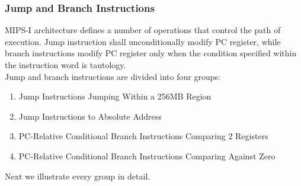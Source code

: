 \documentclass[]{scrartcl}
\begin{document}
\subsubsection{Jump and Branch Instructions}

MIPS-I architecture defines a number of operations that control the path
of execution. Jump instruction shall unconditionally modify PC register,
while branch instructions modify PC register only when the condition
specified within the instruction word is tautology.\\

Jump and branch instructions are divided into four groups:

\begin{enumerate}

\item Jump Instructions Jumping Within a 256MB Region
\item Jump Instructions to Absolute Address
\item PC-Relative Conditional Branch Instructions Comparing 2 Registers
\item PC-Relative Conditional Branch Instructions Comparing Against Zero

\end{enumerate}

Next we illustrate every group in detail.
\end{document}
